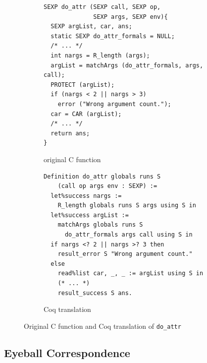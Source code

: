 \documentclass[
    sigplan,
    10pt,
    review, %
    natbib=false %
 ]{acmart}
\newcommand\et[1]{\todo[color=blue!20,size=\scriptsize]{#1}}
\newcommand\CoqR{CoqR}
\begin{document}

\begin{figure}[t]
    \centering{}
\begin{subfigure}{.54\textwidth}
\begin{verbatim}
SEXP do_attr (SEXP call, SEXP op,
              SEXP args, SEXP env){
  SEXP argList, car, ans;
  static SEXP do_attr_formals = NULL;
  /* ... */
  int nargs = R_length (args);
  argList = matchArgs (do_attr_formals, args, call);
  PROTECT (argList);
  if (nargs < 2 || nargs > 3)
    error ("Wrong argument count.");
  car = CAR (argList);
  /* ... */
  return ans;
}
\end{verbatim}
\vspace{-0.5em}
    \caption{original C function}
    \label{fig:c:do_attr}
\end{subfigure}
\begin{subfigure}{.45\textwidth}
\begin{verbatim}
Definition do_attr globals runs S
    (call op args env : SEXP) :=
  let%success nargs :=
    R_length globals runs S args using S in
  let%success argList :=
    matchArgs globals runs S
      do_attr_formals args call using S in
  if nargs <? 2 || nargs >? 3 then
    result_error S "Wrong argument count."
  else
    read%list car, _, _ := argList using S in
    (* ... *)
    result_success S ans.
\end{verbatim}
\vspace{-0.5em}
    \caption{Coq translation}
    \label{fig:coq:do_attr}
\end{subfigure}
\vspace{-1em}
    \caption{Original C function and Coq translation of \texttt{do_attr}}
    \label{fig:do_attr}
\end{figure}

\subsection{Eyeball Correspondence}
\label{sec:eyeball:closeness}


\end{document}
